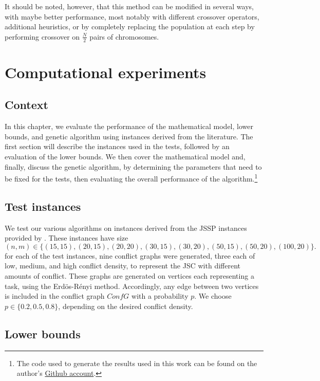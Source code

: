 \documentclass{mimosis}
\begin{document}
It should be noted, however, that this method can be modified in several ways, with maybe better performance, most notably with different crossover operators, additional heuristics, or by completely replacing the population at each step by performing crossover on \(\frac{N}{2}\) pairs of chromosomes.


\chapter{Computational experiments} \label{chapter:experiments}

\section{Context} 

In this chapter, we evaluate the performance of the mathematical model, lower bounds, and genetic algorithm using instances derived from the literature. The first section will describe the instances used in the tests, followed by an evaluation of the lower bounds. We then cover the mathematical model and, finally, discuss the genetic algorithm, by determining the parameters that need to be fixed for the tests, then evaluating the overall performance of the algorithm.\footnote{The code used to generate the results used in this work can be found on the author's \href{https://github.com/amartignoni/JSC_makespan_minimization_bachelor_thesis}{Github account}.}

\section{Test instances}

We test our various algorithms on instances derived from the JSSP instances provided by \citet{taillard1993benchmarks}. These instances have size \[(n,m) \in \{(15,15),(20,15),(20,20),(30,15),(30,20),(50,15),(50,20),(100,20)\}.\] 
for each of the test instances, nine conflict graphs were generated, three each of low, medium, and high conflict density, to represent the JSC with different amounts of conflict. These graphs are generated on vertices each representing a task, using the Erdös-Rényi \citep{erdos1959random} method. Accordingly, any edge between two vertices is included in the conflict graph \(ConfG\) with a probability \(p\). We choose \(p \in \{0.2, 0.5, 0.8\}\), depending on the desired conflict density.  

\section{Lower bounds} \label{sec:exp_lower_bounds_results}
\end{document}
